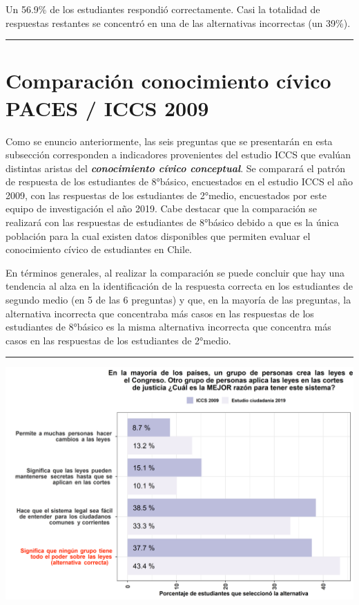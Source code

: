 \documentclass[
  14pt,
]{book}
\let\origfigure\figure
\let\endorigfigure\endfigure
\renewenvironment{figure}[1][2] {
  \expandafter\origfigure\expandafter[H]
} {
  \endorigfigure
}
\begin{document}
Un 56.9\% de los estudiantes respondió correctamente. Casi la totalidad de respuestas restantes se concentró en una de las alternativas incorrectas (un 39\%).

\begin{center}\rule{0.5\linewidth}{0.5pt}\end{center}

\hypertarget{comparaciuxf3n-conocimiento-cuxedvico-paces-iccs-2009}{%
\section{Comparación conocimiento cívico PACES / ICCS 2009}\label{comparaciuxf3n-conocimiento-cuxedvico-paces-iccs-2009}}

Como se enuncio anteriormente, las seis preguntas que se presentarán en esta subsección corresponden a indicadores provenientes del estudio ICCS que evalúan distintas aristas del \textbf{\emph{conocimiento cívico conceptual}}. Se comparará el patrón de respuesta de los estudiantes de 8°básico, encuestados en el estudio ICCS el año 2009, con las respuestas de los estudiantes de 2°medio, encuestados por este equipo de investigación el año 2019. Cabe destacar que la comparación se realizará con las respuestas de estudiantes de 8°básico debido a que es la única población para la cual existen datos disponibles que permiten evaluar el conocimiento cívico de estudiantes en Chile.

En términos generales, al realizar la comparación se puede concluir que hay una tendencia al alza en la identificación de la respuesta correcta en los estudiantes de segundo medio (en 5 de las 6 preguntas) y que, en la mayoría de las preguntas, la alternativa incorrecta que concentraba más casos en las respuestas de los estudiantes de 8°básico es la misma alternativa incorrecta que concentra más casos en las respuestas de los estudiantes de 2°medio.

\begin{center}\rule{0.5\linewidth}{0.5pt}\end{center}

\begin{figure}[!ht]

{\centering \includegraphics[width=0.8\linewidth,]{images/graph_p1} 

}

\caption{Comparación con ICCS: Razones para crear leyes en el Congreso}\label{fig:unnamed-chunk-19}
\end{figure}
\end{document}

